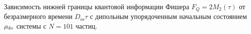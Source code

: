 Зависимость нижней границы квантовой информации Фишера $F_Q = 2M_2(\tau)$ от безразмерного времени $D_\mathrm{es}\tau$ с дипольным упорядоченным начальным состоянием $\rho_\mathrm{do}$ системы с $N=101$ частиц.
